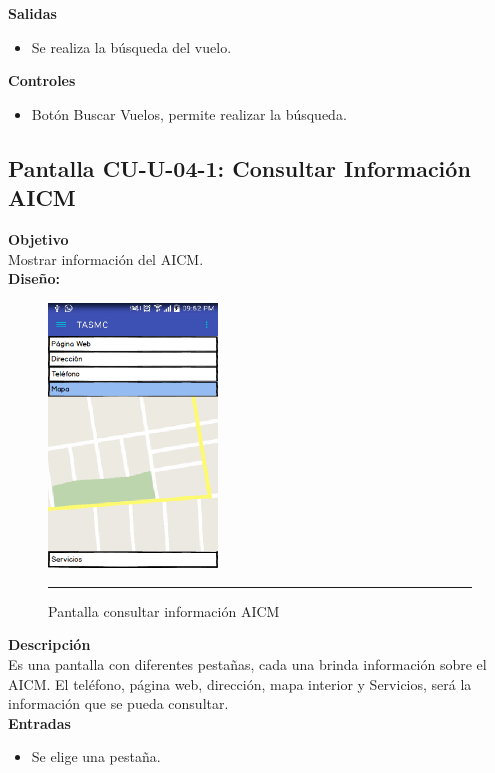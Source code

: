 \textbf{Salidas}
\begin{itemize}
\item Se realiza la búsqueda del vuelo.
\end{itemize}

\textbf{Controles}
\begin{itemize}
\item Botón Buscar Vuelos, permite realizar la búsqueda.
\end{itemize}
\clearpage
\hypertarget{CU-U-04-1}{}
\subsection{Pantalla CU-U-04-1: Consultar Información AICM}
\textbf{Objetivo}\\
Mostrar información del AICM. \\

\textbf{Diseño:}
\begin{figure}[h]
	\centering
		\includegraphics[width=0.4\textwidth]{Figuras/intConsultarInformacionAICM.png}
		\rule{30em}{0.5pt}
	\caption[Pantalla consultar información AICM]{Pantalla consultar información AICM}
	\label{fig:intConsultarInformacionAICM}
\end{figure}

\textbf{Descripción} \\
Es una pantalla con diferentes pestañas, cada una brinda información sobre el AICM. El teléfono, página web, dirección, mapa interior y Servicios, será la información que se pueda consultar. \\

\textbf{Entradas}
\begin{itemize}
\item Se elige una pestaña.
\end{itemize}

